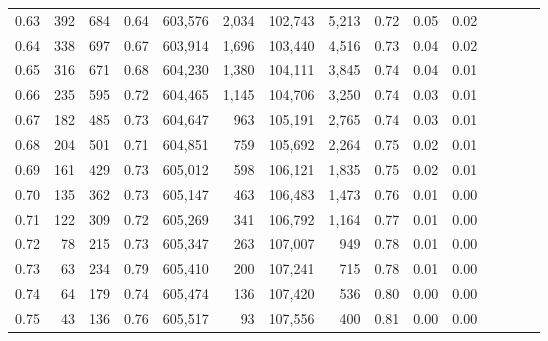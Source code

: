 \begin{tabular}{rrrcrrrrrrrrrrr}
0.63 &     392 &    684 &                                       0.64 &  603,576 &    2,034 &  102,743 &    5,213 &  0.72 &  0.05 &                         0.02 \\
0.64 &     338 &    697 &                                       0.67 &  603,914 &    1,696 &  103,440 &    4,516 &  0.73 &  0.04 &                         0.02 \\
0.65 &     316 &    671 &                                       0.68 &  604,230 &    1,380 &  104,111 &    3,845 &  0.74 &  0.04 &                         0.01 \\
0.66 &     235 &    595 &                                       0.72 &  604,465 &    1,145 &  104,706 &    3,250 &  0.74 &  0.03 &                         0.01 \\
0.67 &     182 &    485 &                                       0.73 &  604,647 &      963 &  105,191 &    2,765 &  0.74 &  0.03 &                         0.01 \\
0.68 &     204 &    501 &                                       0.71 &  604,851 &      759 &  105,692 &    2,264 &  0.75 &  0.02 &                         0.01 \\
0.69 &     161 &    429 &                                       0.73 &  605,012 &      598 &  106,121 &    1,835 &  0.75 &  0.02 &                         0.01 \\
0.70 &     135 &    362 &                                       0.73 &  605,147 &      463 &  106,483 &    1,473 &  0.76 &  0.01 &                         0.00 \\
0.71 &     122 &    309 &                                       0.72 &  605,269 &      341 &  106,792 &    1,164 &  0.77 &  0.01 &                         0.00 \\
0.72 &      78 &    215 &                                       0.73 &  605,347 &      263 &  107,007 &      949 &  0.78 &  0.01 &                         0.00 \\
0.73 &      63 &    234 &                                       0.79 &  605,410 &      200 &  107,241 &      715 &  0.78 &  0.01 &                         0.00 \\
0.74 &      64 &    179 &                                       0.74 &  605,474 &      136 &  107,420 &      536 &  0.80 &  0.00 &                         0.00 \\
0.75 &      43 &    136 &                                       0.76 &  605,517 &       93 &  107,556 &      400 &  0.81 &  0.00 &                         0.00 \\

\end{tabular}
